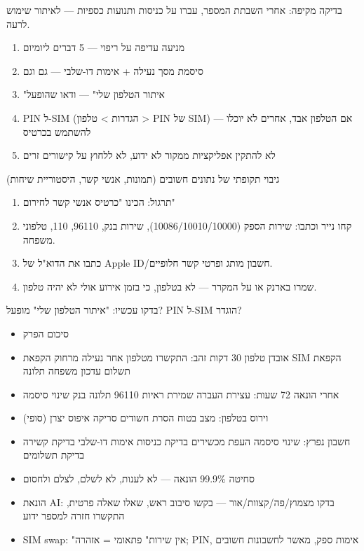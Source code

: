 \begin{tcbwarn}{בדיקה מקיפה: אחרי השבתת המספר, עברו על כניסות ותנועות כספיות — לאיתור שימוש לרעה.}
\begin{enumerate}
  \item מניעה עדיפה על ריפוי — 5 דברים ליומיום
  \item סיסמת מסך נעילה + אימות דו-שלבי — גם וגם
  \item "איתור הטלפון שלי" — ודאו שהופעל
  \item PIN ל-SIM (הגדרות > טלפון > PIN של SIM) — אם הטלפון אבד, אחרים לא יוכלו להשתמש בכרטיס
  \item לא להתקין אפליקציות ממקור לא ידוע, לא ללחוץ על קישורים זרים
\end{enumerate}

\end{tcbwarn}

\begin{tcbpractice}{גיבוי תקופתי של נתונים חשובים (תמונות, אנשי קשר, היסטוריית שיחות)}
\begin{enumerate}
  \item תרגול: הכינו "כרטיס אנשי קשר לחירום"
  \item קחו נייר וכתבו: שירות הספק (10086/10010/10000), שירות בנק, 96110, 110, טלפוני משפחה.
  \item כתבו את הדוא"ל של Apple ID/חשבון מותג ופרטי קשר חלופיים.
  \item שמרו בארנק או על המקרר — לא בטלפון, כי בזמן אירוע אולי לא יהיה טלפון.
\end{enumerate}

\end{tcbpractice}

\begin{tcbsummary}{בדקו עכשיו: "איתור הטלפון שלי" מופעל? PIN ל-SIM הוגדר?}
\begin{itemize}
  \item סיכום הפרק
  \item אובדן טלפון 30 דקות זהב: התקשרו מטלפון אחר נעילה מרחוק הקפאת SIM הקפאת תשלום עדכון משפחה תלונה
  \item אחרי הונאה 72 שעות: עצירת העברה שמירת ראיות 96110 תלונה בנק שינוי סיסמה
  \item וירוס בטלפון: מצב בטוח הסרת חשודים סריקה איפוס יצרן (סופי)
  \item חשבון נפרץ: שינוי סיסמה העפת מכשירים בדיקת כניסות אימות דו-שלבי בדיקת קשירה בדיקת תשלומים
  \item סחיטה 99.9\% הונאה — לא לענות, לא לשלם, לצלם ולחסום
  \item הונאת AI: בדקו מצמוץ/פה/קצוות/אור — בקשו סיבוב ראש, שאלו שאלה פרטית, התקשרו חזרה למספר ידוע
  \item SIM swap: "אין שירות" פתאומי = אזהרה; PIN, אימות ספק, מאשר לחשבונות חשובים
\end{itemize}

\end{tcbsummary}
